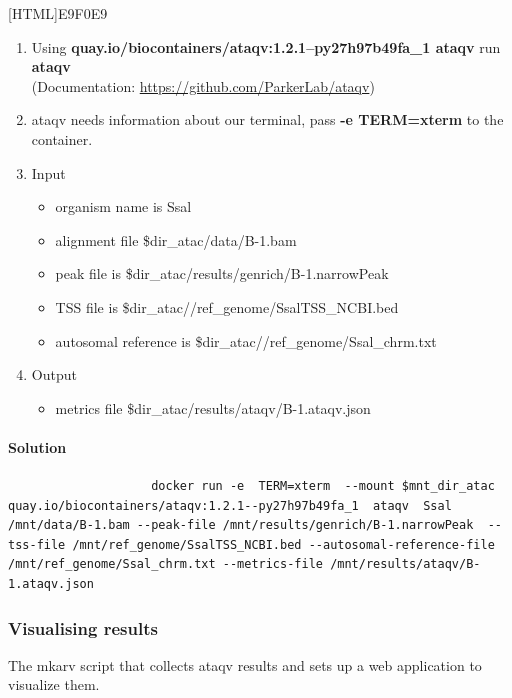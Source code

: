 \documentclass[12pt]{article}
\begin{document}
			[HTML]{E9F0E9}{\parbox{\linewidth}{%
					\begin{enumerate}
						\item  Using \textbf{quay.io/biocontainers/ataqv:1.2.1--py27h97b49fa\_1 ataqv} run \textbf{ataqv}\\
						(Documentation: \url{https://github.com/ParkerLab/ataqv})
						\item ataqv needs information about our terminal, pass \textbf{-e TERM=xterm} to the container.
						\item Input
						\begin{itemize}
							\item organism name is Ssal
							\item alignment file \$dir\_atac/data/B-1.bam
							\item peak file is \$dir\_atac/results/genrich/B-1.narrowPeak
							\item TSS file is \$dir\_atac//ref\_genome/SsalTSS\_NCBI.bed
							\item autosomal reference is \$dir\_atac//ref\_genome/Ssal\_chrm.txt
						\end{itemize}
						\item Output
							\begin{itemize}
								\item metrics file 	 \$dir\_atac/results/ataqv/B-1.ataqv.json
							\end{itemize}
					\end{enumerate}
			}}
			
			\paragraph{Solution}
			
			\begin{minipage}{\linewidth}
				\begin{lstlisting}
					docker run -e  TERM=xterm  --mount $mnt_dir_atac quay.io/biocontainers/ataqv:1.2.1--py27h97b49fa_1 	ataqv  Ssal  /mnt/data/B-1.bam --peak-file /mnt/results/genrich/B-1.narrowPeak 	--tss-file /mnt/ref_genome/SsalTSS_NCBI.bed --autosomal-reference-file /mnt/ref_genome/Ssal_chrm.txt --metrics-file /mnt/results/ataqv/B-1.ataqv.json
				\end{lstlisting}
			\end{minipage}
			
		\subsubsection{Visualising results}
			The mkarv script that collects ataqv results and sets up a web application to visualize them.
			
\end{document}
